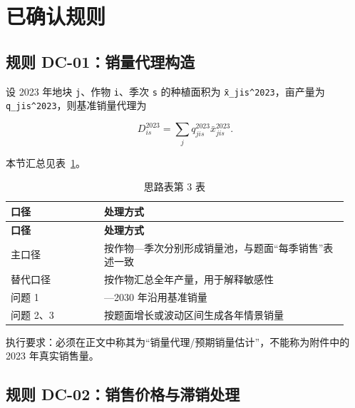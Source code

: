 \documentclass[UTF8,11pt,a4paper]{ctexart}
\begin{document}
\section{已确认规则}

\subsection{规则 DC-01：销量代理构造}

设 2023 年地块 \texttt{j}、作物 \texttt{i}、季次 \texttt{s} 的种植面积为 \texttt{x̄\_jis\textasciicircum{}2023}，亩产量为 \texttt{q\_jis\textasciicircum{}2023}，则基准销量代理为

\[
D_{is}^{2023}=\sum_j q_{jis}^{2023}\bar x_{jis}^{2023}.
\]

\noindent 本节汇总见表~\ref{tab:thought-3}。
\begin{longtable}{@{}>{\raggedright\arraybackslash}p{0.26\linewidth}>{\raggedright\arraybackslash}p{0.68\linewidth}@{}}
\caption{思路表第 3 表}\label{tab:thought-3}\\
\toprule
\textbf{口径} & \textbf{处理方式} \\
\midrule
\endfirsthead
\toprule
\textbf{口径} & \textbf{处理方式} \\
\midrule
\endhead
主口径 & 按作物—季次分别形成销量池，与题面“每季销售”表述一致 \\
替代口径 & 按作物汇总全年产量，用于解释敏感性 \\
问题 1 & 2024—2030 年沿用基准销量 \\
问题 2、3 & 按题面增长或波动区间生成各年情景销量 \\
\bottomrule
\end{longtable}

执行要求：必须在正文中称其为“销量代理/预期销量估计”，不能称为附件中的 2023 年真实销售量。

\subsection{规则 DC-02：销售价格与滞销处理}
\end{document}
